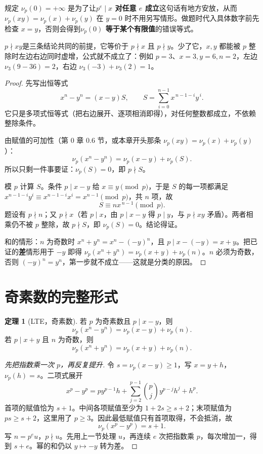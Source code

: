 \documentclass[UTF8,a4paper,11pt,twoside,openright,fontset=fandol]{ctexbook}
\theoremstyle{definition}
\newtheorem{theorem}[definition]{定理}
\begin{document}
\begin{tip}[口径：为什么规定 $\nu_p(0)=+\infty$]
规定 $\nu_p(0)=+\infty$ 是为了让\textbf{$p^e\mid x$ 对任意 $e$ 成立}这句话有地方安放，从而 $\nu_p(xy)=\nu_p(x)+\nu_p(y)$ 在 $y=0$ 时不用另写情形。做题时代入具体数字前先检查 $x=y$，否则会得到\textbf{$\nu_p(0)$ 等于某个有限值}的错误等式。
\end{tip}


\begin{tip}
\textbf{$p\nmid xy$}是三条结论共同的前提，它等价于 $p\nmid x$ 且 $p\nmid y$。少了它，$x,y$ 都能被 $p$ 整除时左边右边同时虚增，公式就不成立了：例如 $p=3$、$x=3,y=6,n=2$，左边 $\nu_3(9-36)=2$，右边 $\nu_3(-3)+\nu_3(2)=1$。
\end{tip}

\begin{proof}
先写出恒等式
\[
 x^n-y^n=(x-y)S,\qquad S=\sum_{i=0}^{n-1}x^{\,n-1-i}y^{\,i}.
\]
它只是多项式恒等式（把右边展开、逐项相消即得），对任何整数都成立，不依赖整除条件。

由赋值的可加性（第 0 章 0.6 节，或本章开头那条 $\nu_p(xy)=\nu_p(x)+\nu_p(y)$）：
\[
 \nu_p(x^n-y^n)=\nu_p(x-y)+\nu_p(S).
\]
所以只剩一件事要证：$\nu_p(S)=0$，即 $p\nmid S$。

模 $p$ 计算 $S$。条件 $p\mid x-y$ 给 $x\equiv y\pmod p$，于是 $S$ 的每一项都满足 $x^{n-1-i}y^{i}\equiv x^{n-1-i}x^{i}=x^{n-1}\pmod p$，共 $n$ 项，故
\[
 S\equiv n x^{\,n-1}\pmod p.
\]
题设有 $p\nmid n$；又 $p\nmid x$（若 $p\mid x$，由 $p\mid x-y$ 得 $p\mid y$，与 $p\nmid xy$ 矛盾）。两者相乘仍不被 $p$ 整除，故 $p\nmid S$，即 $\nu_p(S)=0$。结论得证。

和的情形：$n$ 为奇数时 $x^n+y^n=x^n-(-y)^n$，且 $p\mid x-(-y)=x+y$。把已证的\textbf{差}情形用于 $-y$ 即得
$\nu_p(x^n+y^n)=\nu_p(x+y)+\nu_p(n)$。$n$ 必须为奇数，否则 $(-y)^n=y^n$，第一步就不成立——这就是分类的原因。
\end{proof}

\section{奇素数的完整形式}
\begin{theorem}[LTE，奇素数]
若 $p$ 为奇素数且 $p\mid x-y$，则
\[
 \nu_p(x^n-y^n)=\nu_p(x-y)+\nu_p(n).
\]
若 $p\mid x+y$ 且 $n$ 为奇数，则
\[
 \nu_p(x^n+y^n)=\nu_p(x+y)+\nu_p(n).
\]
\end{theorem}

\begin{proof}[先把指数乘一次 $p$，再反复提升]
令 $s=\nu_p(x-y)\ge1$，写 $x=y+h$，$\nu_p(h)=s$。二项式展开
\[
 x^p-y^p=py^{p-1}h+\sum_{j=2}^{p-1}\binom pj y^{p-j}h^j+h^p.
\]
首项的赋值恰为 $s+1$。中间各项赋值至少为 $1+2s\ge s+2$；末项赋值为 $ps\ge s+2$，这里用了 $p\ge3$。因此最低赋值只有首项取得，不会抵消，故
\[
\nu_p(x^p-y^p)=s+1.
\]
写 $n=p^e u$，$p\nmid u$。先用上一节处理 $u$，再连续 $e$ 次把指数乘 $p$，每次增加一，得到 $s+e$。幂的和仍以 $y\mapsto-y$ 转为差。
\end{proof}
\end{document}
